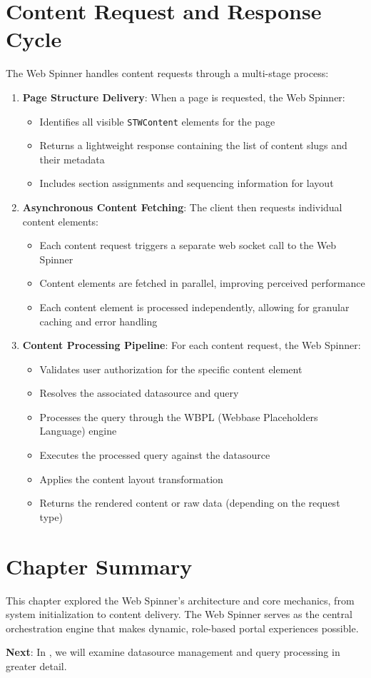 \section{Content Request and Response Cycle}

The Web Spinner handles content requests through a multi-stage process:

\begin{enumerate}
\item \textbf{Page Structure Delivery}: When a page is requested, the Web Spinner:
\begin{itemize}
\item Identifies all visible \texttt{STWContent} elements for the page
\item Returns a lightweight response containing the list of content slugs and their metadata
\item Includes section assignments and sequencing information for layout
\end{itemize}

\item \textbf{Asynchronous Content Fetching}: The client then requests individual content elements:
\begin{itemize}
\item Each content request triggers a separate web socket call to the Web Spinner
\item Content elements are fetched in parallel, improving perceived performance
\item Each content element is processed independently, allowing for granular caching and error handling
\end{itemize}

\item \textbf{Content Processing Pipeline}: For each content request, the Web Spinner:
\begin{itemize}
\item Validates user authorization for the specific content element
\item Resolves the associated datasource and query
\item Processes the query through the WBPL (Webbase Placeholders Language) engine
\item Executes the processed query against the datasource
\item Applies the content layout transformation
\item Returns the rendered content or raw data (depending on the request type)
\end{itemize}
\end{enumerate}

\section{Chapter Summary}

This chapter explored the Web Spinner's architecture and core mechanics, from system initialization to content delivery. The Web Spinner serves as the central orchestration engine that makes dynamic, role-based portal experiences possible.

\textbf{Next}: In , we will examine datasource management and query processing in greater detail.
